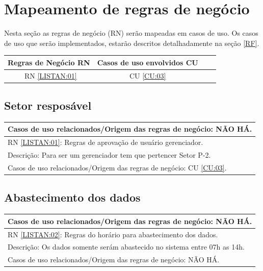 \documentclass[
	12pt,				%
    oneside,			%
	a4paper,			%
	english,			%
	french,				%
	spanish,			%
	brazil,				%
	]{abntex2}
\begin{document}
	
	\section{Mapeamento de regras de negócio}	
		 Nesta seção as regras de negócio (RN) serão mapeadas em casos de uso. Os casos de uso que serão implementados, estarão descritos detalhadamente na seção \ref{RF}.
	
		\begin{center}
			\begin{tabular}{ |c|c|c|c| } 
				\hline
				Regras de Negócio
				RN  & Casos de uso envolvidos
				CU \\
				\hline
				~RN \ref{LISTAN:01}  &  CU \ref{CU:03}  \\ 
				\hline
				
			\end{tabular}
		\end{center}
		\subsection{Setor resposável}
			\begin{center}
			
					\begin{tabular}{|l|}
						\hline
						Casos de uso relacionados/Origem das regras de negócio: NÃO HÁ.  
						\\ \hline
						RN \ref{LISTAN:01}: Regras de aprovação de usuário gerenciador.                                                                   \\ \hline
						Descrição: Para ser um gerenciador tem que pertencer Setor P-2. \\ \hline
						Casos de uso relacionados/Origem das regras de negócio: CU \ref{CU:03}.                                                                   \\ \hline
					\end{tabular}
			
			\end{center}
		\subsection{Abastecimento dos dados}

				\begin{center}
				
				\begin{tabular}{|l|}
					
					\hline
					Casos de uso relacionados/Origem das regras de negócio: NÃO HÁ.  
					\\ \hline
					RN \ref{LISTAN:02}: Regras do horário para abastecimento dos dados.                                                                   \\ \hline
					Descrição: Os dados somente serám abastecido  no sistema entre 07h as 14h. \\ \hline
					Casos de uso relacionados/Origem das regras de negócio: NÃO HÁ.                                                                  \\ \hline
				\end{tabular}
				
			\end{center}
\end{document}
